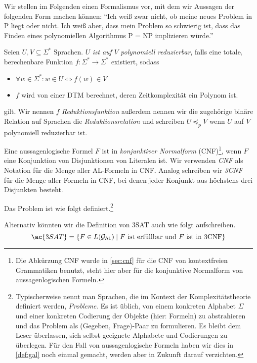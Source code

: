 Wir stellen im Folgenden einen Formalismus vor, mit dem wir
Aussagen der folgenden Form machen können:
"`Ich weiß zwar nicht, ob meine neues Problem in \ac{P} liegt oder nicht.
Ich weiß aber, dass mein Problem so schwierig ist, dass das Finden eines polynomiellen Algorithmus \ac{P} = \ac{NP} implizieren würde."'

\begin{Def}\label{def:PolyReduktion}
	Seien $U, V \subseteq \Sigma^*$ Sprachen.
  \emph{$U$ ist auf $V$ polynomiell reduzierbar}, falls eine totale, berechenbare Funktion
  $f:\Sigma^* \to \Sigma^*$ existiert, sodass
  \begin{itemize}
   \item $\forall w \in \Sigma^*:w \in U \iff f(w) \in V$
   \item $f$ wird von einer \ac{DTM} berechnet, deren Zeitkomplexität ein Polynom ist.
  \end{itemize}
  gilt.
  Wir nennen $f$ \emph{Reduktionsfunktion}
  außerdem nennen wir die zugehörige binäre Relation auf Sprachen die \emph{Reduktionsrelation}
  und schreiben $U \preceq_p V$ wenn $U$ auf $V$ polynomiell reduzierbar ist.
\end{Def}


Eine aussagenlogische Formel $F$ ist in \emph{konjunktiver Normalform} (CNF)\footnote{%
Die Abkürzung \ac{CNF} wurde in \autoref{sec:cnf} für die \acl{CNF} von kontextfreien Grammatiken benutzt,
steht hier aber für die konjunktive Normalform von aussagenlogischen Formeln.
}, wenn $F$ eine Konjunktion von Disjunktionen von Literalen ist.
Wir verwenden \emph{CNF} als Notation für die Menge aller AL-Formeln in CNF.
Analog schreiben wir \emph{3CNF} für die Menge aller Formeln in CNF, bei denen jeder Konjunkt aus höchstens drei Disjunkten besteht.



\begin{Def}[name={[3SAT]}]
Das Problem  ist wie folgt definiert.\footnote{
Typischerweise nennt man Sprachen, die im Kontext der Komplexitätstheorie definiert werden, \emph{Probleme}.
Es ist üblich, von einem konkreten Alphabet $\Sigma$ und einer konkreten Codierung der Objekte (hier: Formeln) zu abstrahieren und das Problem als (Gegeben, Frage)-Paar zu formulieren.
Es bleibt dem Leser überlassen, sich selbst geeignete Alphabete und Codierungen zu überlegen.
Für den Fall von aussagenlogische Formeln haben wir dies in \autoref{def:gal} noch einmal gemacht, werden aber in Zukunft darauf verzichten.}
\begin{center}
\end{center}
	
\end{Def}
Alternativ könnten wir die Definition von \ac{3SAT} auch wie folgt aufschreiben.
$$\ac{3SAT} = \{F\in L(\mathcal{G}_\mathsf{AL})\mid F \text{ ist erfüllbar und $F$ ist in 3CNF}\}$$

